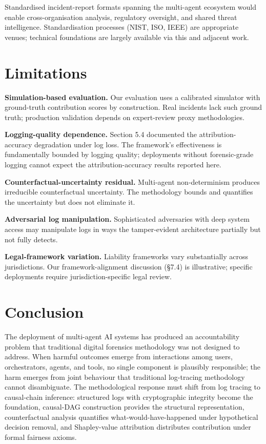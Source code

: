 \documentclass[sigconf,nonacm]{acmart}
\begin{document}
Standardised incident-report formats spanning the multi-agent
ecosystem would enable cross-organisation analysis, regulatory
oversight, and shared threat intelligence. Standardisation
processes (NIST, ISO, IEEE) are appropriate venues; technical
foundations are largely available via this and adjacent work.

\section{Limitations}

\textbf{Simulation-based evaluation.} Our evaluation uses a
calibrated simulator with ground-truth contribution scores by
construction. Real incidents lack such ground truth; production
validation depends on expert-review proxy methodologies.

\textbf{Logging-quality dependence.} Section 5.4 documented the
attribution-accuracy degradation under log loss. The framework's
effectiveness is fundamentally bounded by logging quality;
deployments without forensic-grade logging cannot expect the
attribution-accuracy results reported here.

\textbf{Counterfactual-uncertainty residual.} Multi-agent
non-determinism produces irreducible counterfactual uncertainty.
The methodology bounds and quantifies the uncertainty but does not
eliminate it.

\textbf{Adversarial log manipulation.} Sophisticated adversaries
with deep system access may manipulate logs in ways the
tamper-evident architecture partially but not fully detects.

\textbf{Legal-framework variation.} Liability frameworks vary
substantially across jurisdictions. Our framework-alignment
discussion (§7.4) is illustrative; specific deployments require
jurisdiction-specific legal review.

\section{Conclusion}

The deployment of multi-agent AI systems has produced an
accountability problem that traditional digital forensics
methodology was not designed to address. When harmful outcomes
emerge from interactions among users, orchestrators, agents, and
tools, no single component is plausibly responsible; the harm
emerges from joint behaviour that traditional log-tracing
methodology cannot disambiguate. The methodological response must
shift from log tracing to causal-chain inference: structured logs
with cryptographic integrity become the foundation, causal-DAG
construction provides the structural representation, counterfactual
analysis quantifies what-would-have-happened under hypothetical
decision removal, and Shapley-value attribution distributes
contribution under formal fairness axioms.
\end{document}
